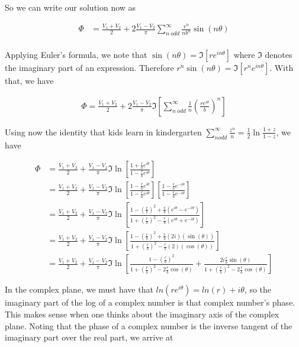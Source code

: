 \documentclass[paper=a4, fontsize=11pt]{scrartcl} %
\numberwithin{equation}{section} %
\numberwithin{figure}{section} %
\numberwithin{table}{section} %
\begin{document}
So we can write our solution now as

\begin{align}
\Phi &= \frac{V_1 + V_2}{2} + 2 \frac{V_1 - V_2}{\pi} \sum_{n \ odd}^{\infty} \frac{r^n}{nb^n}\sin(n \theta) \\
\end{align}

Applying Euler's formula, we note that $\sin(n \theta) = \Im [re^{i n \theta}]$ where $\Im$ denotes the imaginary part of an expression. Therefore $r^n \sin(n \theta) = \Im[r^n e^{i n\theta}]$. With that, we have

\begin{align}
\Phi = \frac{V_1 + V_2}{2} + 2 \frac{V_1 - V_2}{\pi} \Im \left[\sum_{n \ odd}^{\infty} \frac{1}{n}\left(\frac{r e^{i \theta}}{b}\right)^n \right]
\end{align}

Using now the identity that kids learn in kindergarten $\sum_{n odd}^{\infty} \frac{z^n}{n} = \frac{1}{2}\ln\frac{1 + z}{1-z}$, we have

\begin{align}
\Phi &= \frac{V_1 + V_2}{2} +  \frac{V_1 - V_2}{\pi} \Im\ln\left[\frac{1 + \frac{r}{b}e^{i \theta}}{1 - \frac{r}{b}e^{i \theta}}\right] \\
&= \frac{V_1 + V_2}{2} +  \frac{V_1 - V_2}{\pi} \Im\ln\left[\frac{1 - \frac{r}{b}e^{i \theta}}{1 - \frac{r}{b}e^{i \theta}}\right]\left[\frac{1 - \frac{r}{b}e^{-i \theta}}{1 - \frac{r}{b}e^{-i \theta}}\right] \\
&= \frac{V_1 + V_2}{2} +  \frac{V_1 - V_2}{\pi} \Im\ln\left[\frac{1 - \left(\frac{r}{b}\right)^2 + \frac{r}{b}(e^{i \theta} - e^{- i \theta})}{1 + \left(\frac{r}{b}\right)^2 - \frac{r}{b}(e^{i \theta} + e^{-i \theta})}\right]\\ 
&= \frac{V_1 + V_2}{2} +  \frac{V_1 - V_2}{\pi} \Im\ln\left[\frac{1 - \left(\frac{r}{b}\right)^2 + \frac{r}{b}(2i)(\sin(\theta))}{1 + \left(\frac{r}{b}\right)^2 - \frac{r}{b}(2)(\cos(\theta))}\right]\\ 
&= \frac{V_1 + V_2}{2} +  \frac{V_1 - V_2}{\pi}\Im\ln\left[\frac{1 - \left(\frac{r}{b}\right)^2}{1 + \left(\frac{r}{b}\right)^2 - 2 \frac{r}{b}\cos(\theta)} + \frac{2 i \frac{r}{b}\sin(\theta)}{1 + \left(\frac{r}{b}\right)^2 - 2 \frac{r}{b}\cos(\theta)}\right] 
\end{align}

In the complex plane, we must have that $ln(re^{i \theta}) = ln(r) + i \theta$, so the imaginary part of the log of a complex number is that complex number's phase. This makes sense when one thinks about the imaginary axis of the complex plane. Noting that the phase of a complex number is the inverse tangent of the imaginary part over the real part, we arrive at
\end{document}
